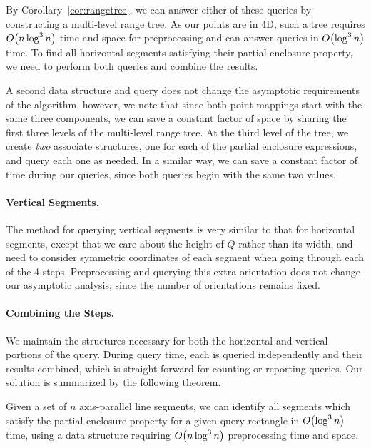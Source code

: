 By Corollary~\ref{cor:rangetree}, we can answer either of these queries by constructing a multi-level range tree.
As our points are in 4D, such a tree requires $O\!\left(n \log^3{n}\right)$ time and space for preprocessing and can answer queries in $O\!\left(\log^3{n}\right)$ time.
To find all horizontal segments satisfying their partial enclosure property, we need to perform both queries and combine the results.  

A second data structure and query does not change the asymptotic requirements of the algorithm, however, we note that since both point mappings start with the same three components, we can save a constant factor of space by sharing the first three levels of the multi-level range tree. 
At the third level of the tree, we create \emph{two} associate structures, one for each of the partial enclosure expressions, and query each one as needed. 
In a similar way, we can save a constant factor of time during our queries, since both queries begin with the same two values.


\paragraph{Vertical Segments.} The method for querying vertical segments is very similar to that for horizontal segments, except that we care about the height of $Q$ rather than its width, and need to consider symmetric coordinates of each segment when going through each of the 4 steps.
Preprocessing and querying this extra orientation does not change our asymptotic analysis, since the number of orientations remains fixed.


\paragraph{Combining the Steps.} We maintain the structures necessary for both the horizontal and vertical portions of the query. During query time, each is queried independently and their results combined, which is straight-forward for counting or reporting queries. Our solution is summarized by the following theorem.

\begin{theorem}
\label{th:ap}
Given a set of $n$ axis-parallel line segments, we can identify all segments which satisfy the partial enclosure property for a given query rectangle in $O\!\left(\log^3{n}\right)$ time, using a data structure requiring $O\!\left(n\log^3{n}\right)$ preprocessing time and space.
\end{theorem}

